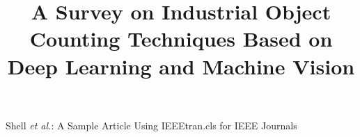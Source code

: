 \documentclass[lettersize,journal]{IEEEtran}
\begin{document}
\title{A Survey on Industrial Object Counting Techniques Based on Deep Learning and Machine Vision}

\author{
}


%
{Shell \MakeLowercase{\textit{et al.}}: A Sample Article Using IEEEtran.cls for IEEE Journals}



\maketitle

\end{document}
